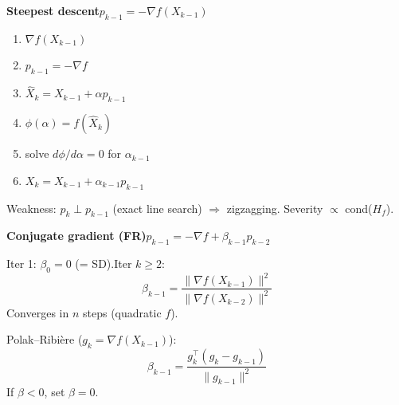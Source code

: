 \documentclass[10pt]{article}
\newlength{\mpw}
\begin{document}
\noindent
\begin{minipage}[t]{\mpw}\vspace{0pt}
  \textbf{Steepest descent}\quad $p_{k-1}=-\nabla f(X_{k-1})$
  \begin{enumerate}\setlength\itemsep{1pt}\setlength\topsep{2pt}
    \item $\nabla f(X_{k-1})$
    \item $p_{k-1}=-\nabla f$
    \item $\hat{X}_k=X_{k-1}+\alpha p_{k-1}$
    \item $\phi(\alpha)=f(\hat{X}_k)$
    \item solve $d\phi/d\alpha=0$ for $\alpha_{k-1}$
    \item $X_k=X_{k-1}+\alpha_{k-1}p_{k-1}$
  \end{enumerate}
  Weakness: $p_k\perp p_{k-1}$ (exact line search) $\Rightarrow$ zigzagging. Severity $\propto$ cond($H_f$).
\end{minipage}\hfill
\begin{minipage}[t]{\mpw}\vspace{0pt}
  \textbf{Conjugate gradient (FR)}\quad $p_{k-1}=-\nabla f+\beta_{k-1}p_{k-2}$

  Iter 1: $\beta_0=0$ (= SD).\quad Iter $k\ge2$:
  \[
    \beta_{k-1}=\frac{\|\nabla f(X_{k-1})\|^2}{\|\nabla f(X_{k-2})\|^2}
  \]
  Converges in $n$ steps (quadratic $f$).

  Polak--Ribi\`ere ($g_k=\nabla f(X_{k-1})$):
  \[
    \beta_{k-1}=\frac{g_k^\top(g_k-g_{k-1})}{\|g_{k-1}\|^2}
  \]
  If $\beta<0$, set $\beta=0$.
\end{minipage}\hfill
\end{document}
